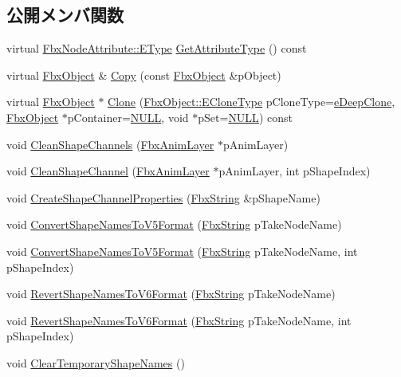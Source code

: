 \subsection*{公開メンバ関数}
\begin{DoxyCompactItemize}
\item 
virtual \hyperlink{class_fbx_node_attribute_a08e1669d3d1a696910756ab17de56d6a}{Fbx\+Node\+Attribute\+::\+E\+Type} \hyperlink{class_fbx_geometry_a41ae23e5d0cf08693bca49737f333de9}{Get\+Attribute\+Type} () const
\item 
virtual \hyperlink{class_fbx_object}{Fbx\+Object} \& \hyperlink{class_fbx_geometry_aac1cee4251e3d5fbd27f1181c58b83b3}{Copy} (const \hyperlink{class_fbx_object}{Fbx\+Object} \&p\+Object)
\item 
virtual \hyperlink{class_fbx_object}{Fbx\+Object} $\ast$ \hyperlink{class_fbx_geometry_aab95116993bd539bb870897d005d44de}{Clone} (\hyperlink{class_fbx_object_a9f5626b2d2135684d6ea1e6e4ad2acbb}{Fbx\+Object\+::\+E\+Clone\+Type} p\+Clone\+Type=\hyperlink{class_fbx_object_a9f5626b2d2135684d6ea1e6e4ad2acbbaacdf137ca059c572798287e98c4236d0}{e\+Deep\+Clone}, \hyperlink{class_fbx_object}{Fbx\+Object} $\ast$p\+Container=\hyperlink{fbxarch_8h_a070d2ce7b6bb7e5c05602aa8c308d0c4}{N\+U\+LL}, void $\ast$p\+Set=\hyperlink{fbxarch_8h_a070d2ce7b6bb7e5c05602aa8c308d0c4}{N\+U\+LL}) const
\item 
void \hyperlink{class_fbx_geometry_ad7d877cff6187c93064395a71b25ecce}{Clean\+Shape\+Channels} (\hyperlink{class_fbx_anim_layer}{Fbx\+Anim\+Layer} $\ast$p\+Anim\+Layer)
\item 
void \hyperlink{class_fbx_geometry_abd8e2642fa8ca94c88afaeafd0267bd0}{Clean\+Shape\+Channel} (\hyperlink{class_fbx_anim_layer}{Fbx\+Anim\+Layer} $\ast$p\+Anim\+Layer, int p\+Shape\+Index)
\item 
void \hyperlink{class_fbx_geometry_ac9c89d3dfee003accd6092682664501b}{Create\+Shape\+Channel\+Properties} (\hyperlink{class_fbx_string}{Fbx\+String} \&p\+Shape\+Name)
\item 
void \hyperlink{class_fbx_geometry_a2b135cea388e72bff364a6fa8714a38b}{Convert\+Shape\+Names\+To\+V5\+Format} (\hyperlink{class_fbx_string}{Fbx\+String} p\+Take\+Node\+Name)
\item 
void \hyperlink{class_fbx_geometry_aa1806aadaf07dac7d895e65f731f1679}{Convert\+Shape\+Names\+To\+V5\+Format} (\hyperlink{class_fbx_string}{Fbx\+String} p\+Take\+Node\+Name, int p\+Shape\+Index)
\item 
void \hyperlink{class_fbx_geometry_a891f23fed585b15503cdf8a38b424e14}{Revert\+Shape\+Names\+To\+V6\+Format} (\hyperlink{class_fbx_string}{Fbx\+String} p\+Take\+Node\+Name)
\item 
void \hyperlink{class_fbx_geometry_a408862417553440cefa975d1366985bb}{Revert\+Shape\+Names\+To\+V6\+Format} (\hyperlink{class_fbx_string}{Fbx\+String} p\+Take\+Node\+Name, int p\+Shape\+Index)
\item 
void \hyperlink{class_fbx_geometry_a2959da5506f3499fdb644a82843a64cd}{Clear\+Temporary\+Shape\+Names} ()
\end{DoxyCompactItemize}
